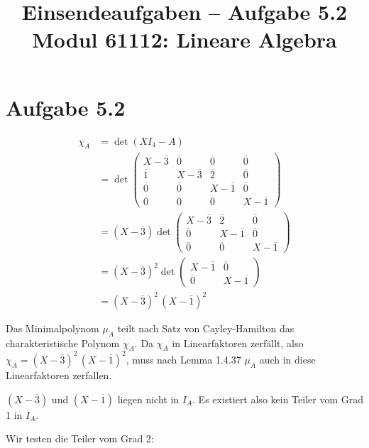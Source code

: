 \documentclass[a4paper,12pt]{article}
\title{Einsendeaufgaben -- Aufgabe 5.2\\[0.5em]
\large Modul 61112: Lineare Algebra}
\author{}
\date{}
\begin{document}
\maketitle

\section*{Aufgabe 5.2}

\begin{align*}
\chi_A &= \det(XI_4 - A) \\
       &= \det\begin{pmatrix}
            X-\overline{3} & \overline{0}   & \overline{0}   & \overline{0} \\
            \overline{1}   & X-\overline{3} & \overline{2}   & \overline{0} \\
            \overline{0}   & \overline{0}   & X-\overline{1} & \overline{0} \\
            \overline{0}   & \overline{0}   & \overline{0}   & X-\overline{1}
          \end{pmatrix} \\
       &= (X-\overline{3}) \det\begin{pmatrix}
            X-\overline{3} & \overline{2}   & \overline{0} \\
            \overline{0}   & X-\overline{1} & \overline{0} \\
            \overline{0}   & \overline{0}   & X-\overline{1}
          \end{pmatrix} \\
       &= (X-\overline{3})^{2} \det\begin{pmatrix}
            X-\overline{1} & \overline{0} \\
            \overline{0}   & X-\overline{1}
          \end{pmatrix} \\
       &= (X-\overline{3})^{2}\, (X-\overline{1})^{2}
\end{align*}

Das Minimalpolynom $\mu_A$ teilt nach Satz von Cayley-Hamilton das charakteristische Polynom $\chi_A$. Da $\chi_A$ in Linearfaktoren zerfällt, also $\chi_A = (X-\overline{3})^{2}\, (X-\overline{1})^{2}$, muss nach Lemma 1.4.37 $\mu_A$ auch in diese Linearfaktoren zerfallen.

$(X-\overline{3})$ und $(X-\overline{1})$ liegen nicht in $I_A$. Es existiert also kein Teiler vom Grad 1 in $I_A$.

Wir testen die Teiler vom Grad 2:
\end{document}
